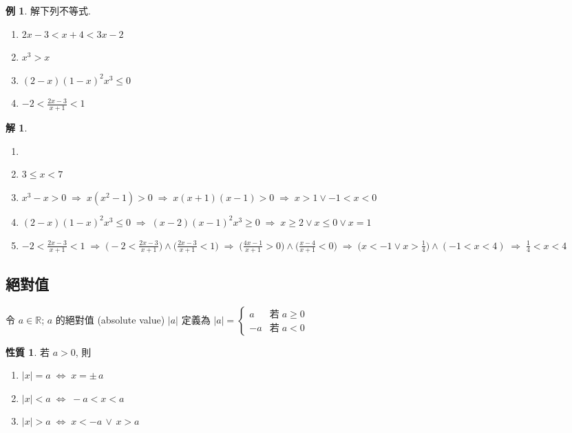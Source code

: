 \documentclass[12pt,a4paper]{extarticle}
\newcommand{\ds}{\displaystyle}
\newcommand{\ie}{\;\Longrightarrow\;}
\newcommand{\ifff}{\;\Longleftrightarrow\;}
\theoremstyle{definition}
\newtheorem*{prp}{性質}
\newtheorem*{ex}{例}
\newtheorem*{sol}{解}
\begin{document}
\begin{ex}
  解下列不等式. 
  \setlength{\columnsep}{-20mm}
  \begin{multicols}{2}
    \begin{enumerate}\setlength\itemsep{0em}
      \item $\ds 2x - 3 < x + 4 < 3 x - 2$
      \item $\ds x^3 > x$
      \item $\ds (2 - x)(1 - x)^2 x^3 \leqslant 0$
      \item $\ds -2 < \frac{2x - 3}{x + 1} < 1$
    \end{enumerate}
  \end{multicols}
\end{ex}

\begin{sol}
  \begin{enumerate}\setlength\itemsep{0em}
    \item[]
    \item $\ds 3 \leqslant x < 7$
    \item $\ds x^3 - x > 0 \ie x(x^2 - 1) > 0 \ie x(x + 1)(x - 1) > 0 \ie x > 1 \vee -1 < x < 0$
    \item $\ds (2 - x)(1 - x)^2 x^3 \leqslant 0 \ie (x - 2)(x - 1)^2 x^3 \geqslant 0 \ie x\geqslant 2 \vee x\leqslant 0\vee x = 1$
    \item $\ds -2 < \frac{2x - 3}{x + 1} < 1 \ie \Big(-2 < \frac{2x - 3}{x + 1}\Big)\wedge\Big(\frac {2x - 3}{x + 1} < 1\Big) \ie \Big(\frac{4x - 1}{x + 1} > 0\Big) \wedge \Big(\frac{x - 4}{x + 1} < 0\Big) \ie \Big(x < -1 \vee x > \frac{1}{4}\Big) \wedge (-1 < x < 4) \ie \frac{1}{4} < x < 4$
  \end{enumerate}
\end{sol}

\subsection*{絕對值}
令 $a\in\mathbb{R}$;  $a$ 的絕對值 (absolute value) $|a|$ 定義為 $\ds|a|=\begin{cases} a & \text{若}\;a\geqslant 0 \\ - a&\text{若}\;a < 0\end{cases}$

\begin{prp}
  若 $a > 0$, 則
  \setlength{\columnsep}{-20mm}
  \begin{multicols}{3}
    \begin{enumerate}\setlength\itemsep{0em}
      \item $\ds |x| = a \ifff x = \pm\,a$
      \item $\ds |x| < a \ifff -a < x < a$
      \item $\ds |x| > a \ifff x < -a \,\vee\, x > a$
    \end{enumerate}
  \end{multicols}
\end{prp}
\end{document}
